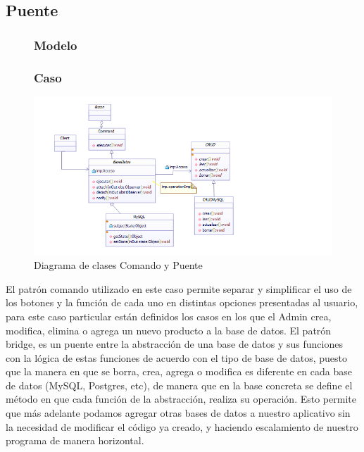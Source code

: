 \subsection{Puente}\begin{figure}[h!]
	
\subsubsection{Modelo}
\newpage
\subsubsection{Caso}
\centering
\includegraphics[width=1.0\linewidth]{arquitectura/imagenes/DiagramaComandoYPuente}
\caption{Diagrama de clases  Comando y Puente}
\end{figure}



El patrón comando utilizado en este caso permite separar y simplificar el uso de los botones y la función de cada uno en distintas opciones presentadas al usuario, para este caso particular están definidos los casos en los que el Admin crea, modifica, elimina o agrega un nuevo producto a la base de datos.
El patrón bridge, es un puente entre la abstracción de una base de datos y sus funciones con la lógica de estas funciones de acuerdo con el tipo de base de datos, puesto que la manera en que se borra, crea, agrega o modifica es diferente en cada base de datos (MySQL, Postgres, etc), de manera que en la base concreta se define el método en que cada función de la abstracción, realiza su operación. Esto permite que más adelante podamos agregar otras bases de datos a nuestro aplicativo sin la necesidad de modificar el código ya creado, y haciendo escalamiento de nuestro programa de manera horizontal.

\newpage


